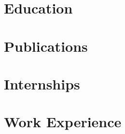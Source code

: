 \documentclass{prometheus_cv}
\begin{document}
\thispagestyle{empty}					%
\pagestyle{fancy}			 		%

\vspace*{-1cm}
\centering


\vspace*{0.4cm}
\section{Education}


\section{Publications}


\section{Internships}


\section{Work Experience}


%

%


%


%
\end{document}
